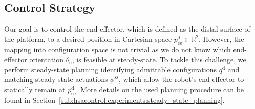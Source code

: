 \subsection{Control Strategy}\label{sub:hsacontrol:configuration_space_regulation:control_strategy}

Our goal is to control the end-effector, which is defined as the distal surface of the platform, to a desired position in Cartesian space $p_\mathrm{ee}^\mathrm{d} \in \mathbb{R}^2$. 
However, the mapping into configuration space is not trivial as we do not know which end-effector orientation $\theta_\mathrm{ee}$ is feasible at steady-state. 
To tackle this challenge, we perform steady-state planning identifying admittable configurations $q^\mathrm{d}$ and matching steady-state actuations $\phi^\mathrm{ss}$, which allow the robot's end-effector to statically remain at $p_\mathrm{ee}^\mathrm{d}$. More details on the used planning procedure can be found in Section~\ref{sub:hsacontrol:experiments:steady_state_planning}.

